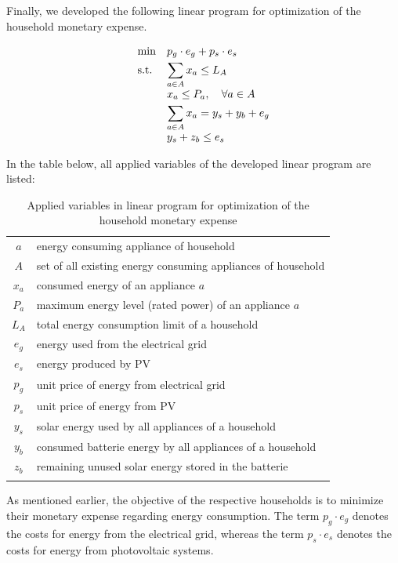 Finally, we developed the following linear program for optimization of the household monetary expense.

\begin{equation}
    \begin{array}{ll@{}ll}
        \text{min}  & \displaystyle p_{g} \cdot e_{g} + p_{s} \cdot e_{s} &\\
        \text{s.t.}& \displaystyle \sum\limits_{a \in A}^{} x_{a} \leq L_{A}  \\
					& \displaystyle x_{a} \leq P_{a}, \quad \forall a \in A \\
					& \displaystyle \sum\limits_{a \in A}^{} x_{a} = y_{s} + y_{b} + e_{g} \\
					& \displaystyle y_{s} + z_{b} \leq e_{s}
    \end{array}
\end{equation}

\clearpage
In the table below, all applied variables of the developed linear program are listed:

\begin{longtable}{c|l}
	\hline
    $a$ & energy consuming appliance of household \\
	$A$ & set of all existing energy consuming appliances of household \\
	$x_{a}$ & consumed energy of an appliance $a$ \\
	$P_{a}$ & maximum energy level (rated power) of an appliance $a$ \\
	$L_{A}$ & total energy consumption limit of a household \\
	$e_{g}$ & energy used from the electrical grid \\
	$e_{s}$ & energy produced by PV \\
	$p_{g}$ & unit price of energy from electrical grid \\
	$p_{s}$ & unit price of energy from PV \\
	$y_{s}$ & solar energy used by all appliances of a household \\
	$y_{b}$ & consumed batterie energy by all appliances of a household \\
	$z_{b}$ & remaining unused solar energy stored in the batterie \\
	\hline
	\caption{Applied variables in linear program for optimization of the household monetary expense}
	\label{table:applied_variables_lp}
\end{longtable} 

As mentioned earlier,
the objective of the respective households is to minimize
their monetary expense regarding energy consumption.
The term $p_{g} \cdot e_{g}$ denotes the costs for energy from the electrical
grid, whereas the term $p_{s} \cdot e_{s}$ denotes the costs for energy from photovoltaic systems. 

